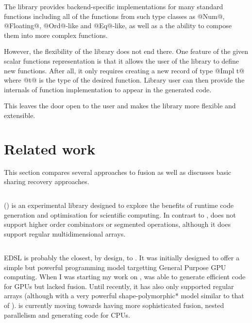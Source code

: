\documentclass[preamble.tex]{subfiles}
\begin{document}
The library provides backend-specific implementations for many standard functions including all of the functions from such type classes as @Num@, @Floating@, @Ord@-like and @Eq@-like, as well as a the ability to compose them into more complex functions.

However, the flexibility of the library does not end there. One feature of the given scalar functions representation is that it allows the user of the library to define new functions. After all, it only requires creating a new record of type @Impl t@ where @t@ is the type of the desired function. Library user can then provide the internals of function implementation to appear in the generated code.

This leaves the door open to the user and makes the library more flexible and extensible.


\clearpage
\section{Related work}

This section compares several approaches to fusion as well as discusses basic sharing recovery approaches.


\subsection{}
\label{sec:DESOLA}

 () \cite{RMKB06} is an experimental  library designed to explore the benefits of runtime code generation and optimisation for scientific computing. In contrast to \DPH,  does not support higher order combinators or segmented operations, although it does support regular multidimensional arrays.


\subsection{}

 EDSL\iedsl \cite{CKL+11, McDonell:2013wi, CliftonEverest:2014vi} is probably the closest, by design, to \LiveFusion. It was initially designed to offer a simple but powerful programming model targetting General Purpose GPU computing. When I was starting my work on \LiveFusion,  was able to generate efficient code for GPUs but lacked fusion. Until recently, it has also only supported regular arrays (although with a very powerful \*shape-polymorphic* model similar to that of \Repa \cite{KCL+10}).  is currently moving towards having more sophisticated fusion, nested parallelism and generating code for CPUs.
\end{document}
